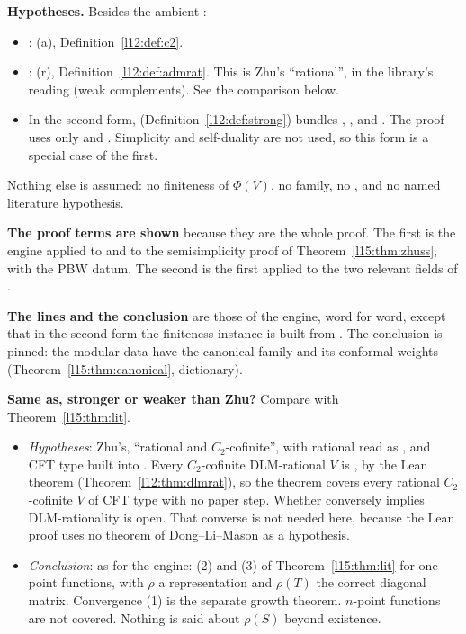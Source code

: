 \begin{dictionary}
\textbf{Hypotheses.} Besides the ambient :
\begin{itemize}
\item {}: (a), Definition~\ref{l12:def:c2}.
\item {}: (r), Definition~\ref{l12:def:admrat}. This is Zhu's ``rational'', in the library's
  reading (weak complements). See the comparison below.
\item In the second form,  (Definition~\ref{l12:def:strong}) bundles ,
  ,  and . The proof uses only 
  and . Simplicity and self-duality are not used, so this form is a special case of the first.
\end{itemize}
Nothing else is assumed: no finiteness of $\Phi(V)$, no family, no , and no named literature hypothesis.

\textbf{The proof terms are shown} because they are the whole proof. The first is the engine
\allowbreak{}\allowbreak{} applied to  and to the semisimplicity proof
\allowbreak{}\allowbreak{} of Theorem~\ref{l15:thm:zhuss}, with  the PBW datum. The
second is the first applied to the two relevant fields of .

\textbf{The  lines and the conclusion} are those of the engine, word for word, except that in the second form the
finiteness instance is built from . The conclusion is pinned: the modular data have the canonical family
and its conformal weights (Theorem~\ref{l15:thm:canonical}, dictionary).

\textbf{Same as, stronger or weaker than Zhu?} Compare with Theorem~\ref{l15:thm:lit}.
\begin{itemize}
\item \emph{Hypotheses}: Zhu's, ``rational and $C_2$-cofinite'', with rational read as , and CFT
  type built into . Every $C_2$-cofinite DLM-rational $V$ is , by
  the Lean theorem  (Theorem~\ref{l12:thm:dlmrat}), so the theorem covers every
  rational $C_2$-cofinite $V$ of CFT type with no paper step. Whether  conversely implies DLM-rationality is open. That converse is not
  needed here, because the Lean proof uses no theorem of Dong--Li--Mason as a hypothesis.
\item \emph{Conclusion}: as for the engine: (2) and (3) of Theorem~\ref{l15:thm:lit} for one-point functions, with $\rho$ a
  representation and $\rho(T)$ the correct diagonal matrix. Convergence (1) is the separate growth theorem. $n$-point
  functions are not covered. Nothing is said about $\rho(S)$ beyond existence.
\end{itemize}


\end{dictionary}
